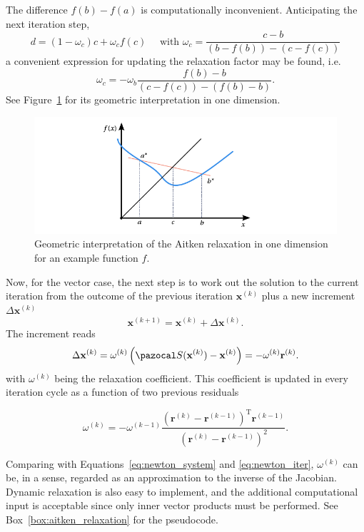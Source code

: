 The difference \(f(b)-f(a)\) is computationally inconvenient.
Anticipating the next iteration step,
\begin{equation}
d=\left(1-\omega_{c}\right) c+\omega_{c} f(c) \quad \text { with } \omega_{c}=\frac{c-b}{\left(b-f(b)\right)-\left(c-f(c)\right)}
\end{equation}
a convenient expression for updating the relaxation factor may be found, i.e.
\begin{equation}
\omega_{c}=-\omega_{b}\frac{f(b)-b}{(c-f(c))-(f(b)-b)}.
\end{equation}
See Figure~\ref{fig:mod_aitken} for its geometric interpretation in one dimension.

\begin{figure}[htbp]
  \includegraphics{figures/mod_aitken}
  \caption{Geometric interpretation of the Aitken relaxation in one dimension for an example function \(f\).}
  \label{fig:mod_aitken}
\end{figure}

Now, for the vector case, the next step is to work out the solution to the current iteration from the outcome of the previous iteration $\mathbf{x}^{(k)}$ plus a new increment $\Delta \mathbf{x}^{(k)}$
\begin{equation}
\mathbf{x}^{(k+1)}=\mathbf{x}^{(k)}+\Delta \mathbf{x}^{(k)}.
\end{equation}
The increment reads
\begin{equation} \label{eq:aitken_update}
\Delta \mathbf{x}^{(k)}=\omega^{(k)}\left(\pazocal S(\mathbf{x}^{(k)})-\mathbf{x}^{(k)}\right)=-\omega^{(k)} \mathbf r^{(k)}.
\end{equation}
with $\omega^{(k)}$ being the relaxation coefficient.
This coefficient is updated in every iteration cycle as a function of two previous residuals
\begin{highlight}
  \begin{equation} \label{eq:aitken_relaxation_factor}
    \omega^{(k)}=-\omega^{(k-1)} \frac{\left(\mathbf{r}^{(k)}-\mathbf{r}^{(k-1)}\right)^{\mathrm{T}} \mathbf{r}^{(k-1)}}{\left(\mathbf{r}^{(k)}-\mathbf{r}^{(k-1)}\right)^{2}}.
  \end{equation}
\end{highlight}
Comparing with Equations~\eqref{eq:newton_system} and \eqref{eq:newton_iter}, \(\omega^{(k)}\) can be, in a sense, regarded as an approximation to the inverse of the Jacobian.
Dynamic relaxation is also easy to implement, and the additional computational input is acceptable since only inner vector products must be performed.
See Box~\ref{box:aitken_relaxation} for the pseudocode.

